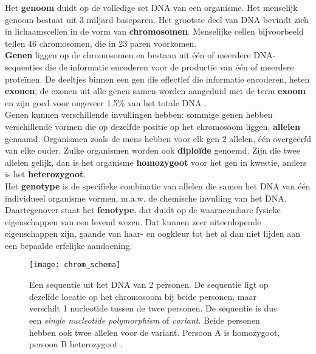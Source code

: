 Het \textbf{genoom} duidt op de volledige set DNA van een organisme. Het menselijk genoom bestaat uit 3 miljard baseparen. Het grootste deel van DNA bevindt zich in lichaamscellen in de vorm van \textbf{chromosomen}. Menselijke cellen bijvoorbeeld tellen 46 chromosomen, die in 23 paren voorkomen.\\
\textbf{Genen} liggen op de chromosomen en bestaan uit \'e\'en of meerdere DNA-sequenties die de informatie encoderen voor de productie van \'e\'en of meerdere prote\"inen. De deeltjes binnen een gen die effectief die informatie encoderen, heten \textbf{exonen}; de exonen uit alle genen samen worden aangeduid met de term \textbf{exoom} en zijn goed voor ongeveer 1.5\% van het totale DNA \cite{broad_exome}.\\
Genen kunnen verschillende invullingen hebben: sommige genen hebben verschillende vormen die op dezelfde positie op het chromosoom liggen, \textbf{allelen} genaamd. Organismen zoals de mens hebben voor elk gen 2 allelen, \'e\'en overge\"erfd van elke ouder. Zulke organismen worden ook \textbf{diplo\"ide} genoemd. Zijn die twee allelen gelijk, dan is het organisme \textbf{homozygoot} voor het gen in kwestie, anders is het \textbf{heterozygoot}.\\
Het \textbf{genotype} is de specifieke combinatie van allelen die samen het DNA van \'e\'en individueel organisme vormen, m.a.w. de chemische invulling van het DNA. Daartegenover staat het \textbf{fenotype}, dat duidt op de waarneembare fysieke eigenschappen van een levend wezen. Dat kunnen zeer uiteenlopende eigenschappen zijn, gaande van haar- en oogkleur tot het al dan niet lijden aan een bepaalde erfelijke aandoening.\\

\begin{figure}[!hb]
\texttt{[image: chrom\_schema]}
\caption{Een sequentie uit het DNA van 2 personen. De sequentie ligt op dezelfde locatie op het chromosoom bij beide personen, maar verschilt 1 nucleotide tussen de twee personen. De sequentie is dus een \textit{single nucleotide polymorphism} of \textit{variant}. Beide personen hebben ook twee allelen voor de variant. Persoon A is homozygoot, persoon B heterozygoot \cite{chrom_clipart}.}
\label{chrom_schema}
\end{figure}

